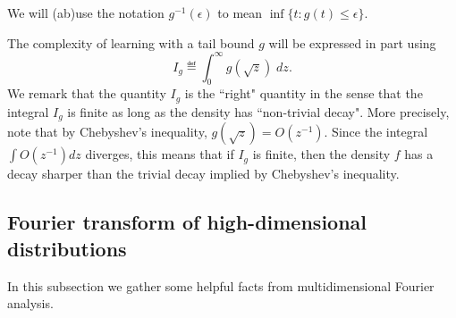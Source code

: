 We will (ab)use the notation $g^{-1}(\epsilon)$ to mean
$\inf \{ t : g(t) \leq \epsilon \}$.

The complexity of learning with a tail bound $g$ will be expressed in part
using
\[
I_g \eqdef \int_0^{\infty} g(\sqrt{z}) \; dz.
\]
We remark that the quantity $I_g$ is the ``right" quantity in the sense that the integral $I_g$ is finite as long as the density has ``non-trivial decay". More precisely, note that by Chebyshev's inequality, $g(\sqrt{z}) = O(z^{-1})$. Since the integral $\int O(z^{-1}) dz$ diverges, this means that if $I_g$ is finite, then the density $f$ has a decay sharper than the trivial decay implied by Chebyshev's inequality.


\subsection{Fourier transform of high-dimensional distributions}

% 

In this subsection we gather some helpful facts from multidimensional
Fourier analysis.




